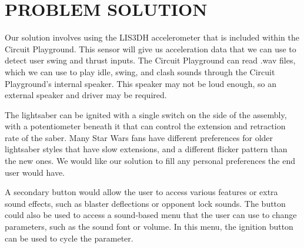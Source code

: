 \documentclass[12pt]{article}
\begin{document}

\section{PROBLEM SOLUTION}

Our solution involves using the LIS3DH accelerometer that is included within the Circuit Playground. This sensor will give us acceleration data that we can use to detect user swing and thrust inputs. The Circuit Playground can read .wav files, which we can use to play idle, swing, and clash sounds through the Circuit Playground's internal speaker. This speaker may not be loud enough, so an external speaker and driver may be required. 

The lightsaber can be ignited with a single switch on the side of the assembly, with a potentiometer beneath it that can control the extension and retraction rate of the saber. Many Star Wars fans have different preferences for older lightsaber styles that have slow extensions, and a different flicker pattern than the new ones. We would like our solution to fill any personal preferences the end user would have. 

A secondary button would allow the user to access various features or extra sound effects, such as blaster deflections or opponent lock sounds. The button could also be used to access a sound-based menu that the user can use to change parameters, such as the sound font or volume. In this menu, the ignition button can be used to cycle the parameter. 
\end{document}
